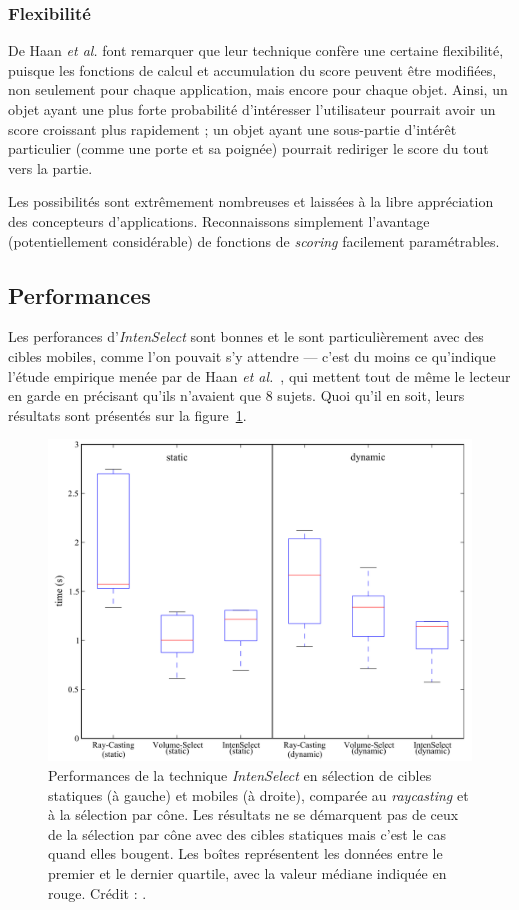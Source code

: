 	\subsubsection{Flexibilité}
	De Haan \emph{et al.} font remarquer que leur technique confère une certaine flexibilité, puisque les fonctions de calcul et accumulation du score peuvent être modifiées, non seulement pour chaque application, mais encore pour chaque objet. Ainsi, un objet ayant une plus forte probabilité d'intéresser l'utilisateur pourrait avoir un score croissant plus rapidement ; un objet ayant une sous-partie d'intérêt particulier (comme une porte et sa poignée) pourrait rediriger le score du tout vers la partie.
	
	Les possibilités sont extrêmement nombreuses et laissées à la libre appréciation des concepteurs d'applications. Reconnaissons simplement l'avantage (potentiellement considérable) de fonctions de \emph{scoring} facilement paramétrables.
	
	\subsection{Performances}
	Les perforances d'\emph{IntenSelect} sont bonnes et le sont particulièrement avec des cibles mobiles, comme l'on pouvait s'y attendre --- c'est du moins ce qu'indique l'étude empirique menée par de Haan \emph{et al.}~\cite{de2005intenselect}, qui mettent tout de même le lecteur en garde en précisant qu'ils n'avaient que 8 sujets. Quoi qu'il en soit, leurs résultats sont présentés sur la figure~\ref{fig:intensPerf}.
	
	\begin{figure}[H]
		\centering
		\includegraphics[width=\textwidth]{figures/ch2/intensPerf}
		\caption[\emph{IntenSelect} -- performances]{Performances de la technique \emph{IntenSelect} en sélection de cibles statiques (à gauche) et mobiles (à droite), comparée au \emph{raycasting} et à la sélection par cône. Les résultats ne se démarquent pas de ceux de la sélection par cône avec des cibles statiques mais c'est le cas quand elles bougent. Les boîtes représentent les données entre le premier et le dernier quartile, avec la valeur médiane indiquée en rouge. Crédit : \cite{de2005intenselect}.}
		\label{fig:intensPerf}
	\end{figure}
	
